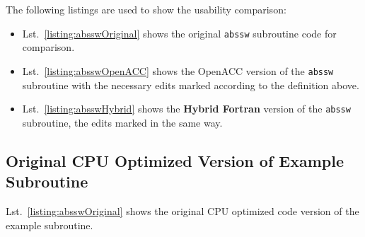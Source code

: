 The following listings are used to show the usability comparison:

\begin{itemize}
 \item Lst.~\ref{listing:absswOriginal} shows the original \verb|abssw| subroutine code for comparison.
 \item Lst.~\ref{listing:absswOpenACC} shows the OpenACC version of the \verb|abssw| subroutine with the necessary edits marked according to the definition above.
 \item Lst.~\ref{listing:absswHybrid} shows the \textbf{Hybrid Fortran} version of the \verb|abssw| subroutine, the edits marked in the same way.
\end{itemize}

\subsection{Original CPU Optimized Version of Example Subroutine}

Lst.~\ref{listing:absswOriginal} shows the original CPU optimized code version of the example subroutine.


